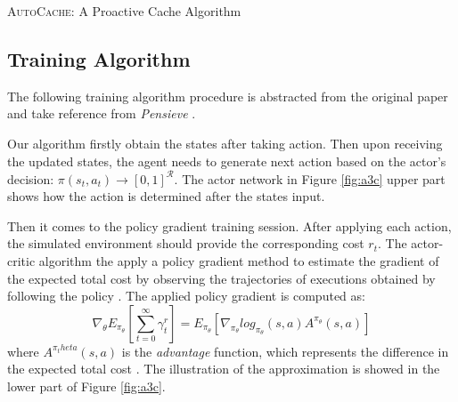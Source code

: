 \documentclass{article}
\begin{document}
\begin{section}{\textsc{AutoCache}: A Proactive Cache Algorithm}
    \subsection{Training Algorithm}
    
    The following training algorithm procedure is abstracted from the original paper \cite{a3c} and take reference from \textit{Pensieve} \cite{Pensieve}.

    Our algorithm firstly obtain the states after taking action.
    Then upon receiving the updated states, the agent needs to generate next action based on the actor's decision: $\pi(s_t, a_t) \to [0,1]^{\mathcal{R}}$. The actor network in Figure \ref{fig:a3c} upper part shows how the action is determined after the states input.
    
    Then it comes to the policy gradient training session. After applying each action, the simulated environment should provide the corresponding cost $r_t$. The actor-critic algorithm the apply a policy gradient method to estimate the gradient of the expected total cost by observing the trajectories of executions obtained by following the policy \cite{Pensieve}. The applied policy gradient is computed as:
    $$
    \nabla_\theta E_{\pi_\theta}[\sum_{t=0}^{\infty} \gamma^ r_t] = E_{\pi_\theta} [\nabla_{\pi_\theta} log_{\pi_\theta}(s,a) A^{\pi_\theta}(s,a)]
    $$
    where $A^{\pi_theta}(s,a)$ is the \textit{advantage} function, which represents the difference in the expected total cost \cite{Pensieve}. The illustration of the approximation is showed in the lower part of Figure \ref{fig:a3c}.

    
    
\end{section}
\end{document}
